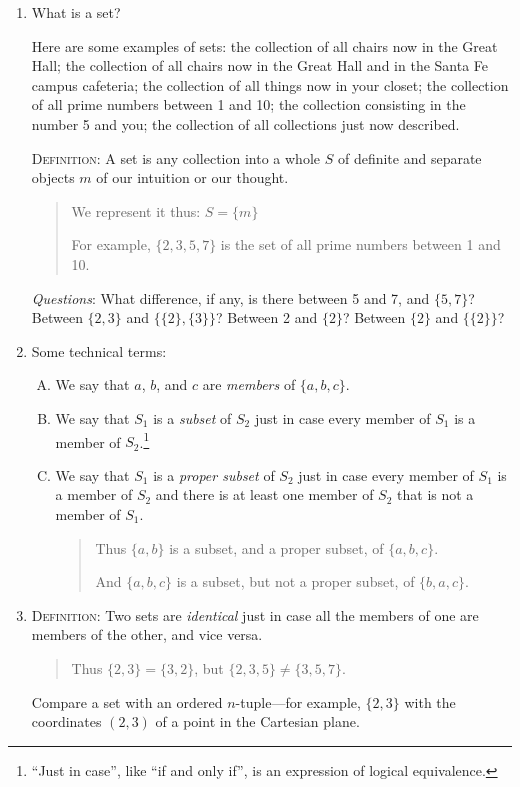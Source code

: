 \documentclass[polutonikogreek,english,twoside,openright]{article}
\begin{document}
\begin{enumerate}
\item What is a set? \label{set}

  Here are some examples of sets: the collection of all chairs now in
  the Great Hall; the collection of all chairs now in the Great Hall
  and in the Santa Fe campus cafeteria; the collection of all things
  now in your closet; the collection of all prime numbers between 1
  and 10; the collection consisting in the number 5 and you; the
  collection of all collections just now described.

  \textsc{Definition}\label{DefSet}: A set is any collection into a
  whole $S$ of definite and separate objects $m$ of our intuition or
  our thought.
\begin{quote}
{\small We represent it thus: $S=\{m\}$

  For example, $\{2,3,5,7\}$ is the set of all prime numbers between 1
  and 10.}
\end{quote}
\emph{Questions}: What difference, if any, is there between 5 and 7,
and $\{5,7\}$? Between $\{2,3\}$ and $\{\{2\},\{3\}\}$? Between 2 and
$\{2\}$? Between $\{2\}$ and $\{\{2\}\}$?
\item Some technical terms:
  \begin{enumerate}[A.]
  \item We say that $a$, $b$, and $c$ are \emph{members} of
    $\{a,b,c\}$.
  \item We say that $S_1$ is a \emph{subset} of $S_2$ just in case
    every member of $S_1$ is a member of
    $S_2$.\protect\footnote{``Just in case'', like ``if and only if'',
      is an expression of logical equivalence.}
  \item We say that $S_1$ is a \emph{proper subset} of $S_2$ just in
    case every member of $S_1$ is a member of $S_2$ and there is at
    least one member of $S_2$ that is not a member of $S_1$.
\begin{quote}
{\small Thus $\{a,b\}$ is a subset, and a proper subset, of $\{a,b,c\}$.

  And $\{a,b,c\}$ is a subset, but not a proper subset, of
  $\{b,a,c\}$.}
\end{quote}
\end{enumerate}
\item \textsc{Definition}: Two sets are \emph{identical} just in case
  all the members of one are members of the other, and vice versa.
  \begin{quote} {\small Thus $\{2,3\}=\{3,2\}$, but
      $\{2,3,5\}\neq\{3,5,7\}$.}
  \end{quote}
  Compare a set with an ordered $n$-tuple---for example, $\{2,3\}$
  with the coordinates $(2,3)$ of a point in the Cartesian plane.


\end{enumerate}
\end{document}
